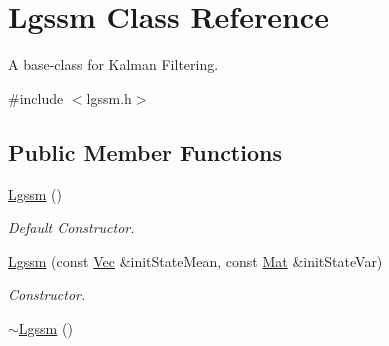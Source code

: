 \hypertarget{classLgssm}{}\section{Lgssm Class Reference}
\label{classLgssm}


A base-\/class for Kalman Filtering.  




{\ttfamily \#include $<$lgssm.\+h$>$}

\subsection*{Public Member Functions}
\begin{DoxyCompactItemize}
\item 
\hyperlink{classLgssm_a8c729ab27738f29225847777b740877e}{Lgssm} ()\hypertarget{classLgssm_a8c729ab27738f29225847777b740877e}{}\label{classLgssm_a8c729ab27738f29225847777b740877e}

\begin{DoxyCompactList}\small\item\em Default Constructor. \end{DoxyCompactList}\item 
\hyperlink{classLgssm_a779def860490023f436b4efe071789fd}{Lgssm} (const \hyperlink{apf__filter_8h_a4c7df05c6f5e8a0d15ae14bcdbc07152}{Vec} \&init\+State\+Mean, const \hyperlink{apf__filter_8h_ae601f56a556993079f730483c574356f}{Mat} \&init\+State\+Var)
\begin{DoxyCompactList}\small\item\em Constructor. \end{DoxyCompactList}\item 
\hyperlink{classLgssm_afdb5db740e12453879d8b985180426a4}{$\sim$\+Lgssm} ()\hypertarget{classLgssm_afdb5db740e12453879d8b985180426a4}{}\label{classLgssm_afdb5db740e12453879d8b985180426a4}


\end{DoxyCompactItemize}

